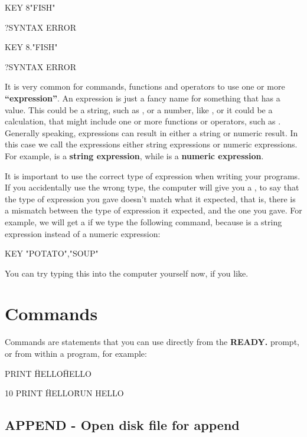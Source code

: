 \begin{screenoutput}
  KEY 8"FISH"

  ?SYNTAX ERROR

  KEY 8."FISH"

  ?SYNTAX ERROR
\end{screenoutput}

It is very common for commands, functions and operators to use one or more {\bf``expression''}.
An expression is just a fancy name for something that has a value.
This could be a string, such as , or a number, like , or it could be a calculation, that might include
one or more functions or operators, such as .
Generally speaking, expressions can result in either a string or numeric result.
In this case we call the expressions either string expressions or numeric expressions.
For example,  is a {\bf string expression}, while  is a {\bf numeric expression}.

It is important to use the correct type of expression when writing your programs.
If you accidentally use the wrong type, the computer will give you a , to say that the type
of expression you gave doesn't match what it expected, that is, there is a mismatch between the type of expression
it expected, and the one you gave.  For example, we will get a  if we type the following command,
because  is a string expression instead of a numeric expression:

\begin{screenoutput}
  KEY "POTATO","SOUP"
\end{screenoutput}

You can try typing this into the computer yourself now, if you like.


\section{Commands}

Commands are statements that you can use directly from the {\bf READY.} prompt, or from within a program, for example:

\begin{screenoutput}
  PRINT \"HELLO\"
  HELLO

  10 PRINT \"HELLO\"
  RUN
  HELLO
\end{screenoutput}

\subsection{APPEND - Open disk file for append}

